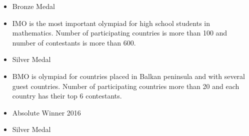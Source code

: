 




\begin{itemize}
\item Bronze Medal
\item IMO is the most important olympiad for high school students in mathematics. Number of participating
countries is more than 100 and number of contestants is more than 600.
\end{itemize} 
\begin{itemize}
\item Silver Medal
\item BMO is olympiad for countries placed in Balkan peninsula and with several guest  countries. Number of participating countries more than 20 and each country has their top 6 contestants.
\end{itemize} 
\begin{itemize}
\item Absolute Winner 2016
\end{itemize}
\begin{itemize}
\item Silver Medal
\end{itemize}


